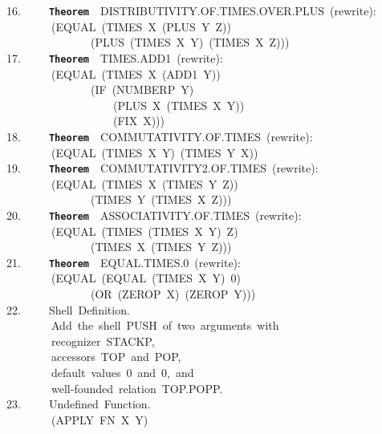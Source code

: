 \documentclass[11pt]{book}
\newenvironment{pubasis}{\begin{flushleft}\ttfamily\small}{\normalsize\rmfamily\end{flushleft}}
\newcommand{\axiomordefinition}[1]{\vspace{6pt}\texttt{\textbf{#1}}}
\begin{document}
\begin{pubasis}
16.~~~~~\axiomordefinition{Theorem}~~DIS\-TRI\-BU\-TIV\-ITY.OF.TIMES.OVER.PLUS~(rewrite):\\
~~~~~~~~(EQUAL~(TIMES~X~(PLUS~Y~Z))\\
~~~~~~~~~~~~~~~(PLUS~(TIMES~X~Y)~(TIMES~X~Z)))\\

17.~~~~~\axiomordefinition{Theorem}~~TIMES.ADD1~(rewrite):\\
~~~~~~~~(EQUAL~(TIMES~X~(ADD1~Y))\\
~~~~~~~~~~~~~~~(IF~(NUMBERP~Y)\\
~~~~~~~~~~~~~~~~~~~(PLUS~X~(TIMES~X~Y))\\
~~~~~~~~~~~~~~~~~~~(FIX~X)))\\

18.~~~~~\axiomordefinition{Theorem}~~COM\-MU\-TA\-TIV\-ITY.OF.TIMES~(rewrite):\\
~~~~~~~~(EQUAL~(TIMES~X~Y)~(TIMES~Y~X))\\

19.~~~~~\axiomordefinition{Theorem}~~COM\-MU\-TA\-TIV\-ITY2.OF.TIMES~(rewrite):\\
~~~~~~~~(EQUAL~(TIMES~X~(TIMES~Y~Z))\\
~~~~~~~~~~~~~~~(TIMES~Y~(TIMES~X~Z)))\\

20.~~~~~\axiomordefinition{Theorem}~~ASSOC\-IATIV\-ITY.OF.TIMES~(rewrite):\\
~~~~~~~~(EQUAL~(TIMES~(TIMES~X~Y)~Z)\\
~~~~~~~~~~~~~~~(TIMES~X~(TIMES~Y~Z)))\\

21.~~~~~\axiomordefinition{Theorem}~~EQUAL.TIMES.0~(rewrite):\\
~~~~~~~~(EQUAL~(EQUAL~(TIMES~X~Y)~0)\\
~~~~~~~~~~~~~~~(OR~(ZEROP~X)~(ZEROP~Y)))\\

22.~~~~~Shell~Definition.\\
~~~~~~~~Add~the~shell~PUSH~of~two~arguments~with\\
~~~~~~~~recognizer~STACKP,\\
~~~~~~~~accessors~TOP~and~POP,\\
~~~~~~~~default~values~0~and~0,~and\\
~~~~~~~~well-founded~relation~TOP.POPP.\\

23.~~~~~Undefined~Function.\\
~~~~~~~~(APPLY~FN~X~Y)\\


\end{pubasis}
\end{document}
